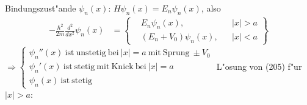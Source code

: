 \documentclass[a4paper]{scrartcl}
\begin{document}
{Bindungszust"ande $\psi_n(x)$: $H \psi_n(x) = E_n \psi_n(x)$, also 
\begin{align}
- \frac{ \hbar^2}{2m} \frac{d^2}{dx^2} \psi_n(x) & = \left\{ \begin{aligned} & E_n \psi_n(x), && \vert x \vert > a \\ & (E_n + V_0) \psi_n(x), && \vert x \vert < a \end{aligned} \right\}
\end{align}
$\Longrightarrow \begin{cases} \psi_n''(x) \mathrm{ \ ist \ unstetig \ bei \ } \vert x \vert = a \mathrm{ \ mit \ Sprung \ } \pm V_0 \\
\psi_n'(x) \mathrm{ \ ist \ stetig \ mit \ Knick \ bei \ } \vert x \vert = a \\ \psi_n(x) \mathrm{ \ ist \ stetig} \end{cases}$
L"osung von (205) f"ur $\vert x \vert > a$:

}
\end{document}
